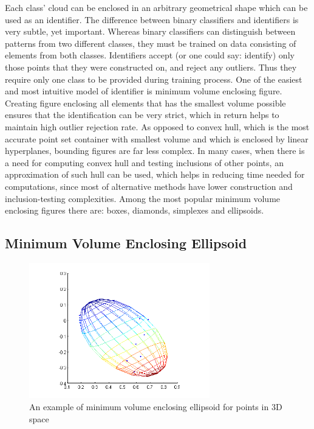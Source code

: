 Each class' cloud can be enclosed in an arbitrary geometrical shape which can be used as an identifier. The difference between binary classifiers and identifiers is very subtle, yet important. Whereas binary classifiers can distinguish between patterns from two different classes, they must be trained on data consisting of elements from both classes. Identifiers accept (or one could say: identify) only those points that they were constructed on, and reject any outliers. Thus they require only one class to be provided during training process. One of the easiest and most intuitive model of identifier is minimum volume enclosing figure. Creating figure enclosing all elements that has the smallest volume possible ensures that the identification can be very strict, which in return helps to maintain high outlier rejection rate. As opposed to convex hull, which is the most accurate point set container with smallest volume and which is enclosed by linear hyperplanes, bounding figures are far less complex. In many cases, when there is a need for computing convex hull and testing inclusions of other points, an approximation of such hull can be used, which helps in reducing time needed for computations, since most of alternative methods have lower construction and inclusion-testing complexities. Among the most popular minimum volume enclosing figures there are: boxes, diamonds, simplexes and ellipsoids.

\subsection{Minimum Volume Enclosing Ellipsoid}

\begin{figure}[htp]
	\centering
	\includegraphics[width=0.70\textwidth]{Figures/minimum_bounding_ellipsoid.png}
	\caption{An example of minimum volume enclosing ellipsoid for points in 3D space}
	\label{fig:minimum_bounding_ellipsoid_visualization}\vspace{-3pt}
\end{figure}

